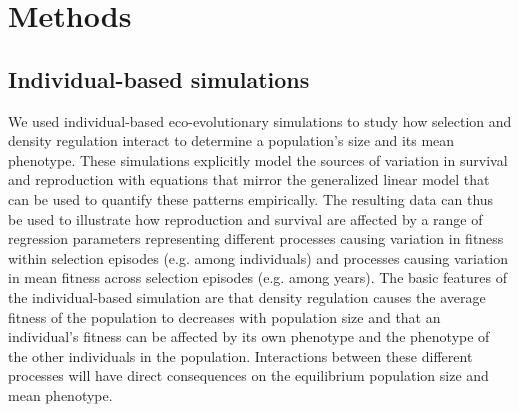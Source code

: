 \documentclass{article}
\begin{document}
\section{Methods}
\subsection{Individual-based simulations}

We used individual-based eco-evolutionary simulations to study how selection and density regulation interact to determine a population's size and its mean phenotype. These simulations explicitly model the sources of variation in survival and reproduction with equations that mirror the generalized linear model that can be used to quantify these patterns empirically. The resulting data can thus be used to illustrate how reproduction and survival are affected by a range of regression parameters representing different processes causing variation in fitness within selection episodes (e.g. among individuals) and processes causing variation in mean fitness across selection episodes (e.g. among years). The basic features of the individual-based simulation are that density regulation causes the average fitness of the population to decreases with population size and that an individual's fitness can be affected by its own phenotype and the phenotype of the other individuals in the population. Interactions between these different processes will have direct consequences on the equilibrium population size and mean phenotype. 
\end{document}
